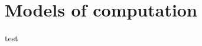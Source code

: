 \documentclass[class=article, crop=false]{standalone}
\begin{document}
\section{Models of computation}

test
\end{document}

